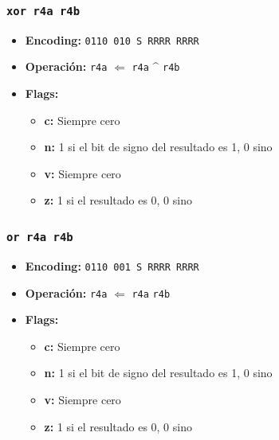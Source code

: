 \documentclass{article}
\begin{document}
\subsubsection{\texttt{xor r4a r4b}}
\begin{itemize}
    \item \textbf{Encoding:} \texttt{0110 010 S RRRR RRRR}
    \item \textbf{Operación:} \texttt{r4a} $\Leftarrow$ \texttt{r4a} \^{} \texttt{r4b}
    \item \textbf{Flags:}
        \begin{itemize}
            \item \textbf{c:} Siempre cero
            \item \textbf{n:} 1 si el bit de signo del resultado es 1, 0 sino
            \item \textbf{v:} Siempre cero
            \item \textbf{z:} 1 si el resultado es 0, 0 sino
        \end{itemize}
\end{itemize}

\subsubsection{\texttt{or r4a r4b}}
\begin{itemize}
    \item \textbf{Encoding:} \texttt{0110 001 S RRRR RRRR}
    \item \textbf{Operación:} \texttt{r4a} $\Leftarrow$ \texttt{r4a} \textbar{} \texttt{r4b}
    \item \textbf{Flags:}
        \begin{itemize}
            \item \textbf{c:} Siempre cero
            \item \textbf{n:} 1 si el bit de signo del resultado es 1, 0 sino
            \item \textbf{v:} Siempre cero
            \item \textbf{z:} 1 si el resultado es 0, 0 sino
        \end{itemize}
\end{itemize}
\end{document}
